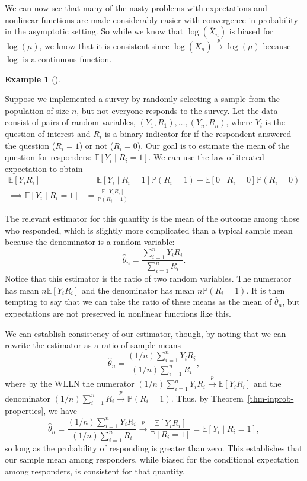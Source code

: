 \documentclass[
  letterpaper,
  DIV=11,
  numbers=noendperiod]{scrreprt}
\newcommand{\E}{\mathbb{E}}
\renewcommand{\P}{\mathbb{P}}
\newcommand{\Xbar}{\overline{X}}
\newcommand{\inprob}{\overset{p}{\to}}
\theoremstyle{definition}
\newtheorem{example}{Example}[chapter]
\theoremstyle{definition}
\theoremstyle{plain}
\theoremstyle{remark}
\begin{document}
We can now see that many of the nasty problems with expectations and
nonlinear functions are made considerably easier with convergence in
probability in the asymptotic setting. So while we know that
\(\log(\Xbar_n)\) is biased for \(\log(\mu)\), we know that it is
consistent since \(\log(\Xbar_n) \inprob \log(\mu)\) because \(\log\) is
a continuous function.

\begin{example}[]\protect\hypertarget{exm-nonresponse}{}\label{exm-nonresponse}

Suppose we implemented a survey by randomly selecting a sample from the
population of size \(n\), but not everyone responds to the survey. Let
the data consist of pairs of random variables,
\((Y_1, R_1), \ldots, (Y_n, R_n)\), where \(Y_i\) is the question of
interest and \(R_i\) is a binary indicator for if the respondent
answered the question (\(R_i = 1\)) or not (\(R_i = 0\)). Our goal is to
estimate the mean of the question for responders:
\(\E[Y_i \mid R_i = 1]\). We can use the law of iterated expectation to
obtain \[
\begin{aligned}
\E[Y_iR_i] &= \E[Y_i \mid R_i = 1]\P(R_i = 1) + \E[ 0 \mid R_i = 0]\P(R_i = 0) \\
\implies \E[Y_i \mid R_i = 1] &= \frac{\E[Y_iR_i]}{\P(R_i = 1)}
\end{aligned}
\]

The relevant estimator for this quantity is the mean of the outcome
among those who responded, which is slightly more complicated than a
typical sample mean because the denominator is a random variable: \[
\widehat{\theta}_n = \frac{\sum_{i=1}^n Y_iR_i}{\sum_{i=1}^n R_i}. 
\] Notice that this estimator is the ratio of two random variables. The
numerator has mean \(n\E[Y_iR_i]\) and the denominator has mean
\(n\P(R_i = 1)\). It is then tempting to say that we can take the ratio
of these means as the mean of \(\widehat{\theta}_n\), but expectations
are not preserved in nonlinear functions like this.

We can establish consistency of our estimator, though, by noting that we
can rewrite the estimator as a ratio of sample means \[
\widehat{\theta}_n = \frac{(1/n)\sum_{i=1}^n Y_iR_i}{(1/n)\sum_{i=1}^n R_i},
\] where by the WLLN the numerator
\((1/n)\sum_{i=1}^n Y_iR_i \inprob \E[Y_iR_i]\) and the denominator
\((1/n)\sum_{i=1}^n R_i \inprob \P(R_i = 1)\). Thus, by
Theorem~\ref{thm-inprob-properties}, we have \[
\widehat{\theta}_n = \frac{(1/n)\sum_{i=1}^n Y_iR_i}{(1/n)\sum_{i=1}^n R_i} \inprob \frac{\E[Y_iR_i]}{\P[R_i = 1]} = \E[Y_i \mid R_i = 1],
\] so long as the probability of responding is greater than zero. This
establishes that our sample mean among responders, while biased for the
conditional expectation among responders, is consistent for that
quantity.

\end{example}
\end{document}
